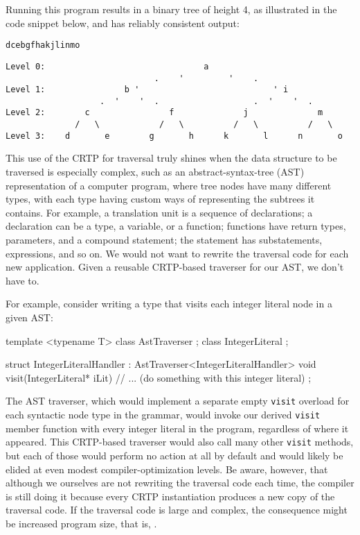 \noindent Running this program results in a binary tree of height 4, as
illustrated in the code snippet below, and has reliably consistent output:

\begin{lstlisting}[style=plain]
dcebgfhakjlinmo
\end{lstlisting}

\begin{lstlisting}[style=plain]
Level 0:                                a
                              .    '         '    .
Level 1:                b '                           ' i
                   .  '    '  .                   .  '    '  .
Level 2:        c                f              j              m
              /   \            /   \          /   \          /   \
Level 3:    d       e        g       h      k       l      n       o
\end{lstlisting}

\noindent This use of the CRTP for traversal truly shines when the data structure to
be traversed is especially complex, such as an abstract-syntax-tree
(AST) representation of a computer program, where tree nodes have many
different types, with each type having custom ways of representing the
subtrees it contains. For example, a translation unit is a sequence of
declarations; a declaration can be a type, a variable, or a function;
functions have return types, parameters, and a compound statement; the
statement has substatements, expressions, and so on. We would not want
to rewrite the traversal code for each new application. Given a reusable
CRTP-based traverser for our AST, we don't have to.

For example, consider writing a type that visits each integer literal
node in a given AST:

\begin{emcppshiddenlisting}[emcppsbatch=e10]
template <typename T>
class AstTraverser {};
class IntegerLiteral {};
\end{emcppshiddenlisting}
\begin{emcppslisting}[emcppsbatch=e10]
struct IntegerLiteralHandler : AstTraverser<IntegerLiteralHandler>
{
    void visit(IntegerLiteral* iLit)
    {
        // ... (do something with this integer literal)
    }
};
\end{emcppslisting}

\noindent The AST traverser, which would implement a separate empty \lstinline!visit!
overload for each syntactic node type in the grammar, would invoke our
derived \lstinline!visit! member function with every integer literal in the
program, regardless of where it appeared. This CRTP-based traverser
would also call many other \lstinline!visit! methods, but each of those would perform no action at all by default and would likely be elided at even modest compiler-optimization levels. Be aware, however, that although we ourselves are
not rewriting the traversal code each time, the compiler is still doing
it because every CRTP instantiation produces a new copy of the traversal
code. If the traversal code is large and complex, the consequence might
be increased program size, that is, \emcppsgloss{code bloat}.

